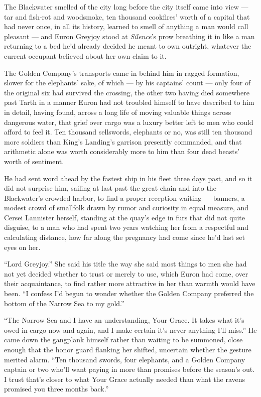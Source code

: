 The Blackwater smelled of the city long before the city itself came into view — tar and fish-rot and woodsmoke, ten thousand cookfires’ worth of a capital that had never once, in all its history, learned to smell of anything a man would call pleasant — and Euron Greyjoy stood at \textit{Silence}’s prow breathing it in like a man returning to a bed he’d already decided he meant to own outright, whatever the current occupant believed about her own claim to it.

The Golden Company’s transports came in behind him in ragged formation, slower for the elephants’ sake, of which — by his captains’ count — only four of the original six had survived the crossing, the other two having died somewhere past Tarth in a manner Euron had not troubled himself to have described to him in detail, having found, across a long life of moving valuable things across dangerous water, that grief over cargo was a luxury better left to men who could afford to feel it. Ten thousand sellswords, elephants or no, was still ten thousand more soldiers than King’s Landing’s garrison presently commanded, and that arithmetic alone was worth considerably more to him than four dead beasts’ worth of sentiment.

He had sent word ahead by the fastest ship in his fleet three days past, and so it did not surprise him, sailing at last past the great chain and into the Blackwater’s crowded harbor, to find a proper reception waiting — banners, a modest crowd of smallfolk drawn by rumor and curiosity in equal measure, and Cersei Lannister herself, standing at the quay’s edge in furs that did not quite disguise, to a man who had spent two years watching her from a respectful and calculating distance, how far along the pregnancy had come since he’d last set eyes on her.

“Lord Greyjoy.” She said his title the way she said most things to men she had not yet decided whether to trust or merely to use, which Euron had come, over their acquaintance, to find rather more attractive in her than warmth would have been. “I confess I’d begun to wonder whether the Golden Company preferred the bottom of the Narrow Sea to my gold.”

“The Narrow Sea and I have an understanding, Your Grace. It takes what it’s owed in cargo now and again, and I make certain it’s never anything I’ll miss.” He came down the gangplank himself rather than waiting to be summoned, close enough that the honor guard flanking her shifted, uncertain whether the gesture merited alarm. “Ten thousand swords, four elephants, and a Golden Company captain or two who’ll want paying in more than promises before the season’s out. I trust that’s closer to what Your Grace actually needed than what the ravens promised you three months back.”

